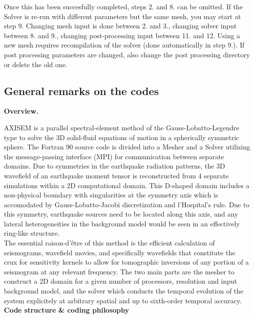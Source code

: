 \documentclass[11pt,letter,fleqn,english,notitlepage]{article}
\begin{document}
Once this has been succesfully completed, steps 2. and 8. can be omitted. If
the Solver is re-run with different parameters but the
same mesh, you may start at step 9. Changing mesh input is done between 2. and
3., changing solver input between 8. and 9.,
changing post-processing input between 11. and 12. Using a new mesh requires
recompilation of the solver (done automatically in step 9.). If post
processing parameters are changed, also change the post processing directory or
delete the old one.

\subsection{General remarks on the codes}

\textbf{Overview.} 

AXISEM is a parallel spectral-element method of the Gauss-Lobatto-Legendre type
to solve the 3D solid-fluid equations of motion in a spherically symmetric
sphere. The Fortran 90 source code is divided into a Mesher and a Solver
utilizing the message-passing interface (MPI) for communication between
separate domains. Due to symmetries in the earthquake radiation patterns, the
3D wavefield of an earthquake moment tensor is reconstructed from 4 separate
simulations within a 2D computational domain. This D-shaped domain
includes a non-physical boundary with singularities at the symmetry axis which
is accomodated by Gauss-Lobatto-Jacobi discretization and l'Hospital's rule.
Due to this symmetry, earthquake
sources need to be located along this axis, and any lateral heterogeneities in
the background model would be seen in an effectively ring-like structure.\\

The essential raison-d'\^{e}tre of this method is the efficient calculation of
seismograms, wavefield movies, and specifically wavefields that constitute the
crux for sensitivity kernels to allow for tomographic inversions of any portion
of a seismogram at any relevant frequency. The two main parts are the mesher to
construct a 2D domain for a given number of processors, resolution and input
background model, and the solver which conducts the temporal evolution of the
system explicitely at arbitrary spatial and up to sixth-order temporal
accuracy.\\

\textbf{Code structure \& coding philosophy}
\end{document}
